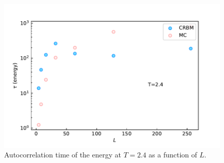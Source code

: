 \documentclass[12pt]{article}
\begin{document}
\begin{figure}[h!]
\begin{center}
    \includegraphics[width=1.0\columnwidth]{../figures/L_many_T_2.4_J1_-1.0_J2_0.0_seed_1968_kernelDims_2-2_analytical_autocorr_E.pdf}
\end{center}
\caption{Autocorrelation time of the energy at $T=2.4$ as a function of $L$.}
\label{fig:tau_E_2.4}
\end{figure}





\end{document}
